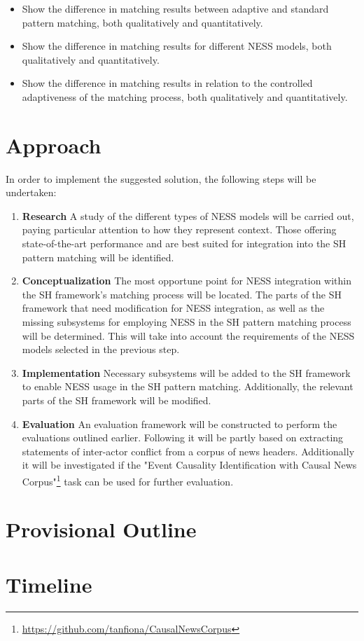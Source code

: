 \documentclass[11pt]{scrreprt}
\let\citef\cite  %
\let\cite\parencite  %
\begin{document}
\begin{itemize}
	\item Show the difference in matching results between adaptive and standard pattern matching, both qualitatively and quantitatively.
	\item Show the difference in matching results for different NESS models, both qualitatively and quantitatively.
	\item Show the difference in matching results in relation to the controlled adaptiveness of the matching process, both qualitatively and quantitatively.


\end{itemize}

\section{Approach}
In order to implement the suggested solution, the following steps will be undertaken:

\begin{enumerate}
 	\item \textbf{Research}
	A study of the different types of NESS models will be carried out, paying particular attention to how they represent context. Those offering state-of-the-art performance and are best suited for integration into the SH pattern matching will be identified.
 	\item \textbf{Conceptualization}
 	The most opportune point for NESS integration within the SH framework's matching process will be located. The parts of the SH framework that need modification for NESS integration, as well as the missing subsystems for employing NESS in the SH pattern matching process will be determined. This will take into account the requirements of the NESS models selected in the previous step.
 	\item \textbf{Implementation}
	Necessary subsystems will be added to the SH framework to enable NESS usage in the SH pattern matching. Additionally, the relevant parts of the SH framework will be modified.
 	\item \textbf{Evaluation}
 	An evaluation framework will be constructed to perform the evaluations outlined earlier. Following \citef{menezesSemanticHypergraphs2021} it will be partly based on extracting statements of inter-actor conflict from a  corpus of news headers. Additionally it will be investigated if the "Event Causality Identification with Causal News Corpus"\footnote{\url{https://github.com/tanfiona/CausalNewsCorpus}} task can be used for further evaluation.
 	
\end{enumerate}


\newpage
\section{Provisional Outline}

\makeatletter

\makeatother


\newpage
\section{Timeline}





\printbibliography[title={References}]
\end{document}
